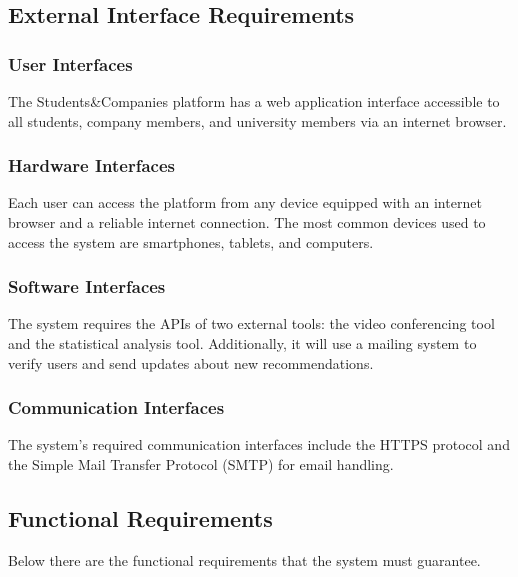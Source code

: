 \subsection{External Interface Requirements}

\subsubsection{User Interfaces}

The Students\&Companies platform has a web application interface accessible to all students, company members, and university 
members via an internet browser.

\subsubsection{Hardware Interfaces}

Each user can access the platform from any device equipped with an internet browser and a reliable internet connection. The
 most common devices used to access the system are smartphones, tablets, and computers.

\subsubsection{Software Interfaces}

The system requires the APIs of two external tools: the video conferencing tool and the statistical analysis tool. 
Additionally, it will use a mailing system to verify users and send updates about new recommendations.

\subsubsection{Communication Interfaces}

The system's required communication interfaces include the HTTPS protocol and the Simple Mail Transfer Protocol (SMTP) 
for email handling.


\subsection{Functional Requirements}
Below there are the functional requirements that the system must guarantee.

